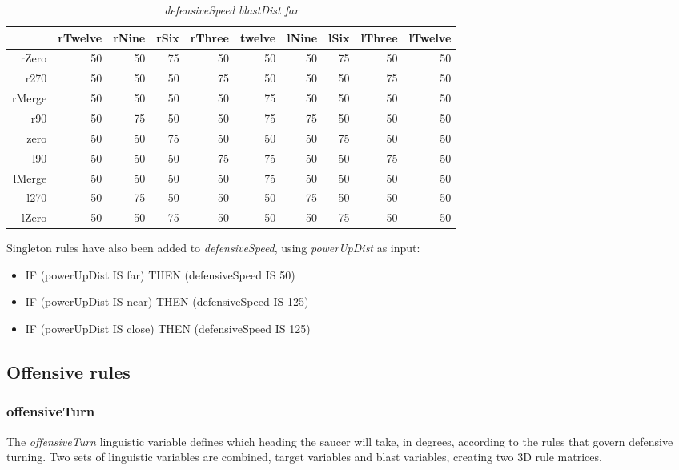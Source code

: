 \begin{table}[H]
\centering
\caption{\emph{defensiveSpeed} \emph{blastDist far}}
\begin{tabular}{r|r|r|r|r|r|r|r|r|r}
 		& rTwelve 	& rNine 	& rSix 		& rThree 		& twelve 	& lNine 	& lSix 		& lThree	& lTwelve		\\ \hline
rZero	& 50		& 50		& 75		& 50 		 	& 50		& 50		& 75 		& 50		& 50			\\
r270	& 50		& 50		& 50		& 75			& 50		& 50		& 50		& 75		& 50			\\
rMerge	& 50		& 50		& 50	 	& 50			& 75		& 50		& 50		& 50		& 50			\\
r90		& 50		& 75		& 50 		& 50			& 75		& 75		& 50		& 50		& 50			\\
zero 	& 50		& 50 		& 75 		& 50			& 50		& 50		& 75		& 50		& 50			\\
l90 	& 50		& 50 		& 50		& 75			& 75		& 50		& 50		& 75		& 50			\\
lMerge	& 50		& 50 		& 50	 	& 50			& 75		& 50		& 50		& 50		& 50			\\
l270 	& 50		& 75	 	& 50 		& 50			& 50		& 75		& 50		& 50		& 50			\\
lZero 	& 50		& 50 		& 75	 	& 50			& 50		& 50  		& 75		& 50		& 50			
\end{tabular}
\end{table}

\noindent
Singleton rules have also been added to \emph{defensiveSpeed}, using \emph{powerUpDist} as input:

\begin{itemize}
\item IF (powerUpDist IS far) THEN (defensiveSpeed IS 50)
\item IF (powerUpDist IS near) THEN (defensiveSpeed IS 125)
\item IF (powerUpDist IS close) THEN (defensiveSpeed IS 125)
\end{itemize}

\subsection{Offensive rules}

\subsubsection{offensiveTurn}

The \emph{offensiveTurn} linguistic variable defines which heading the saucer will take, in degrees, according to the rules that govern defensive turning. Two sets of linguistic variables are combined, target variables and blast variables, creating two 3D rule matrices. 

